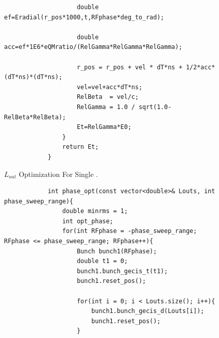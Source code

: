 \documentclass[a4paper,oneside,12pt]{report}
\numberwithin{equation}{chapter}
\begin{document}
{\begin{figure}[H]
\begin{minipage}{\textwidth}
\begin{verbatim}
                    double ef=Eradial(r_pos*1000,t,RFphase*deg_to_rad);
                
                    double acc=ef*1E6*eQMratio/(RelGamma*RelGamma*RelGamma); 
                
                    r_pos = r_pos + vel * dT*ns + 1/2*acc*(dT*ns)*(dT*ns);
                    vel=vel+acc*dT*ns;
                    RelBeta  = vel/c;
                    RelGamma = 1.0 / sqrt(1.0-RelBeta*RelBeta);
                    Et=RelGamma*E0; 
                }
                return Et;
            }
        \end{verbatim}
    \end{minipage}
    \vspace{20pt}
    \caption{$L_{out}$ Optimization For Single \e.}
    \label{fig:lout_opt_single_e}
\end{figure}

\begin{figure}[H]
        \centering
        \begin{verbatim}
            int phase_opt(const vector<double>& Louts, int phase_sweep_range){
                double minrms = 1;
                int opt_phase;
                for(int RFphase = -phase_sweep_range; RFphase <= phase_sweep_range; RFphase++){
                    Bunch bunch1(RFphase);
                    double t1 = 0;
                    bunch1.bunch_gecis_t(t1);
                    bunch1.reset_pos();
            
                    for(int i = 0; i < Louts.size(); i++){
                        bunch1.bunch_gecis_d(Louts[i]);
                        bunch1.reset_pos();
                    }
                        

\end{verbatim}
\end{figure}}
\end{document}
